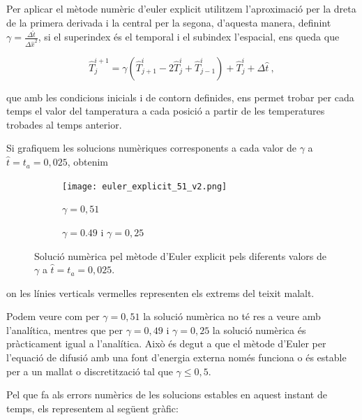 \documentclass[11pt]{article}
\begin{document}
Per aplicar el mètode numèric d'euler explicit utilitzem l'aproximació per la dreta de la primera derivada i la central per la segona, d'aquesta manera, definint $\gamma=\frac{\Delta \hat{t}}{\Delta \hat{x}^2}$, si el superindex és el temporal i el subindex l'espacial, ens queda que 

\begin{equation}
        \hat{T}_j^{i+1} = \gamma \left( \hat{T}_{j+1}^i - 2\hat{T}_j^i + \hat{T}_{j-1}^i \right) 
        + \hat{T}_j^i + \Delta \hat{t} \ ,
    \label{formuleta explicit}
\end{equation}

que amb les condicions inicials i de contorn definides, ens permet trobar per cada temps el valor del tamperatura a cada posició a partir de les temperatures trobades al temps anterior.

Si grafiquem les solucions numèriques corresponents a cada valor de $\gamma$ a $\hat{t}=t_a=0,025$, obtenim

\begin{figure}[hbt!]
    \centering
    \begin{subfigure}{0.5\textwidth}
        \centering
        \texttt{[image: euler\_explicit\_51\_v2.png]}
        \caption{$\gamma=0,51$}
    \end{subfigure}%
    \hspace{0.000001\textwidth}%
    \begin{subfigure}{0.5\textwidth}
        \centering
        \caption{$\gamma=0.49$ i $\gamma=0,25$}
    \end{subfigure}
    \caption{Solució numèrica pel mètode d'Euler explicit pels diferents valors de $\gamma$ a $\hat{t}=t_a=0,025$.}
    \label{fig:resultats_explicit}
\end{figure}

on les línies verticals vermelles representen els extrems del teixit malalt.

Podem veure com per $\gamma=0,51$ la solució numèrica no té res a veure amb l'analítica, mentres que per $\gamma=0,49$ i $\gamma=0,25$ la solució numèrica és pràcticament igual a l'analítica. Això és degut a que el mètode d'Euler per l'equació de difusió amb una font d'energia externa només funciona o és estable per a un mallat o discretització tal que $\gamma \le 0,5$.

Pel que fa als errors numèrics de les solucions estables en aquest instant de temps, els representem al següent gràfic:
\end{document}

